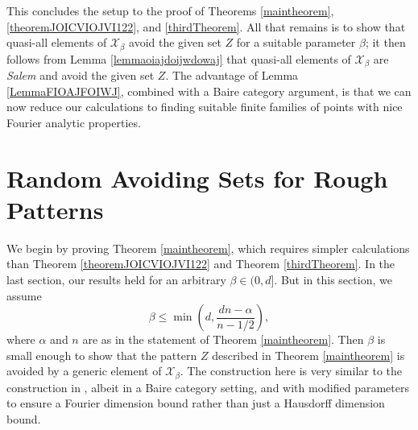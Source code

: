\documentclass[dvipsnames,letterpaper,12pt]{article}
\numberwithin{equation}{section}
\numberwithin{theorem}{section}
\begin{document}
This concludes the setup to the proof of Theorems \ref{maintheorem}, \ref{theoremJOICVIOJVI122}, and \ref{thirdTheorem}. All that remains is to show that quasi-all elements of $\mathcal{X}_\beta$ avoid the given set $Z$ for a suitable parameter $\beta$; it then follows from Lemma \ref{lemmaoiajdoijwdowaj} that quasi-all elements of $\mathcal{X}_\beta$ are \emph{Salem} and avoid the given set $Z$. The advantage of Lemma \ref{LemmaFIOAJFOIWJ}, combined with a Baire category argument, is that we can now reduce our calculations to finding suitable finite families of points with nice Fourier analytic properties.

\section{Random Avoiding Sets for Rough Patterns}

We begin by proving Theorem \ref{maintheorem}, which requires simpler calculations than Theorem \ref{theoremJOICVIOJVI122} and Theorem \ref{thirdTheorem}. In the last section, our results held for an arbitrary $\beta \in (0,d]$. But in this section, we assume
%
\[ \beta \leq \min \left( d, \frac{dn - \alpha}{n - 1/2} \right), \]
%
where $\alpha$ and $n$ are as in the statement of Theorem \ref{maintheorem}. Then $\beta$ is small enough to show that the pattern $Z$ described in Theorem \ref{maintheorem} is avoided by a generic element of $\mathcal{X}_\beta$. The construction here is very similar to the construction in \cite{OurPaper}, albeit in a Baire category setting, and with modified parameters to ensure a Fourier dimension bound rather than just a Hausdorff dimension bound.
\end{document}

